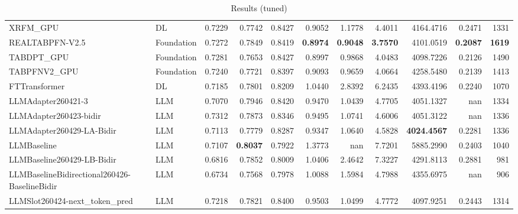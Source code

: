 \begin{table}[htbp]
{\begin{tabular}{ll|rrrrrrrr|r}
XRFM\_GPU & DL & 0.7229 & 0.7742 & 0.8427 & 0.9052 & 1.1778 & 4.4011 & 4164.4716 & 0.2471 & 1331 \\
REALTABPFN-V2.5 & Foundation & 0.7272 & 0.7849 & 0.8419 & \textbf{0.8974} & \textbf{0.9048} & \textbf{3.7570} & 4101.0519 & \textbf{0.2087} & \textbf{1619} \\
TABDPT\_GPU & Foundation & 0.7281 & 0.7653 & 0.8427 & 0.8997 & 0.9868 & 4.0483 & 4098.7226 & 0.2126 & 1490 \\
TABPFNV2\_GPU & Foundation & 0.7240 & 0.7721 & 0.8397 & 0.9093 & 0.9659 & 4.0664 & 4258.5480 & 0.2139 & 1413 \\
\midrule
FTTransformer & DL & 0.7185 & 0.7801 & 0.8209 & 1.0440 & 2.8392 & 6.2435 & 4393.4196 & 0.2240 & 1070 \\
LLMAdapter260421-3 & LLM & 0.7070 & 0.7946 & 0.8420 & 0.9470 & 1.0439 & 4.7705 & 4051.1327 & nan & 1334 \\
LLMAdapter260423-bidir & LLM & 0.7312 & 0.7873 & 0.8346 & 0.9495 & 1.0741 & 4.6006 & 4051.3122 & nan & 1336 \\
LLMAdapter260429-LA-Bidir & LLM & 0.7113 & 0.7779 & 0.8287 & 0.9347 & 1.0640 & 4.5828 & \textbf{4024.4567} & 0.2281 & 1336 \\
LLMBaseline & LLM & 0.7107 & \textbf{0.8037} & 0.7922 & 1.3773 & nan & 7.7201 & 5885.2990 & 0.2403 & 1040 \\
LLMBaseline260429-LB-Bidir & LLM & 0.6816 & 0.7852 & 0.8009 & 1.0406 & 2.4642 & 7.3227 & 4291.8113 & 0.2881 & 981 \\
LLMBaselineBidirectional260426-BaselineBidir & LLM & 0.6734 & 0.7568 & 0.7978 & 1.0088 & 1.5984 & 4.7988 & 4355.6975 & nan & 906 \\
LLMSlot260424-next\_token\_pred & LLM & 0.7218 & 0.7821 & 0.8400 & 0.9503 & 1.0499 & 4.7772 & 4097.9251 & 0.2443 & 1314 \\
\bottomrule
\end{tabular}
}
\caption{Results (tuned)}
\label{tab:results_tuned}
\end{table}